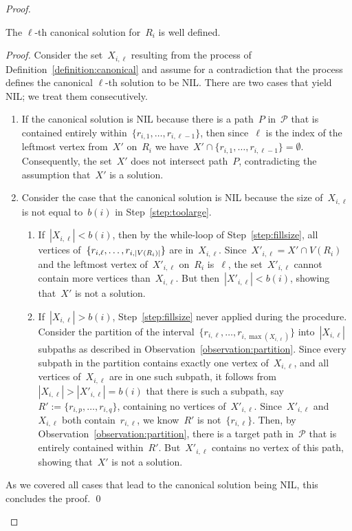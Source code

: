 \let\accentvec\vec  \documentclass{llncs}
\newcommand{\claimqed}{\renewcommand{\squareforqed}{$\lrcorner$}\qed\renewcommand{\squareforqed}{\plainsquareforqed}}
\renewcommand{\P}{\ensuremath{\mathcal{P}}\xspace}
\begin{document}
\begin{proof}
\begin{claim}
The $\ell$-th canonical solution for~$R_i$ is well defined.
\end{claim}
\begin{proof}
Consider the set~$X_{i,\ell}$ resulting from the process of Definition~\ref{definition:canonical} and assume for a contradiction that the process defines the canonical $\ell$-th solution to be NIL. There are two cases that yield NIL; we treat them consecutively.
\begin{enumerate}
	\item If the canonical solution is NIL because there is a path~$P$ in~$\P$ that is contained entirely within~$\{r_{i,1}, \ldots, r_{i,\ell-1}\}$, then since~$\ell$ is the index of the leftmost vertex from~$X'$ on~$R_i$ we have~$X' \cap \{r_{i,1}, \ldots, r_{i,\ell-1}\} = \emptyset$. Consequently, the set~$X'$ does not intersect path~$P$, contradicting the assumption that~$X'$ is a solution.
	\item Consider the case that the canonical solution is NIL because the size of~$X_{i,\ell}$ is not equal to~$b(i)$ in Step~\ref{step:toolarge}.
	\begin{enumerate}
		\item If~$|X_{i,\ell}| < b(i)$, then by the while-loop of Step~\ref{step:fillsize}, all vertices of~$\{r_{i,\ell}, \ldots, \linebreak[1] r_{i,|V(R_i)|}\}$ are in~$X_{i,\ell}$. Since~$X'_{i,\ell} = X' \cap V(R_i)$ and the leftmost vertex of~$X'_{i,\ell}$ on~$R_i$ is~$\ell$, the set~$X'_{i,\ell}$ cannot contain more vertices than~$X_{i,\ell}$. But then~$|X'_{i,\ell}| < b(i)$, showing that~$X'$ is not a solution.
		\item If~$|X_{i,\ell}| > b(i)$, Step~\ref{step:fillsize} never applied during the procedure. Consider the partition of the interval~$\{r_{i,\ell}, \ldots, r_{i,\max(X_{i,\ell})}\}$ into~$|X_{i,\ell}|$ subpaths as described in Observation~\ref{observation:partition}. Since every subpath in the partition contains exactly one vertex of~$X_{i,\ell}$, and all vertices of~$X_{i,\ell}$ are in one such subpath, it follows from~$|X_{i,\ell}| > |X'_{i,\ell}| = b(i)$ that there is such a subpath, say~$R' := \{r_{i,p}, \ldots, r_{i,q}\}$, containing no vertices of~$X'_{i,\ell}$. Since~$X'_{i,\ell}$ and~$X_{i,\ell}$ both contain~$r_{i,\ell}$, we know~$R'$ is not~$\{r_{i,\ell}\}$. Then, by Observation~\ref{observation:partition}, there is a target path in~$\P$ that is entirely contained within~$R'$. But~$X'_{i,\ell}$ contains no vertex of this path, showing that~$X'$ is not a solution.
	\end{enumerate}
\end{enumerate}
As we covered all cases that lead to the canonical solution being NIL, this concludes the proof.
\claimqed
\end{proof}


\end{proof}
\end{document}
